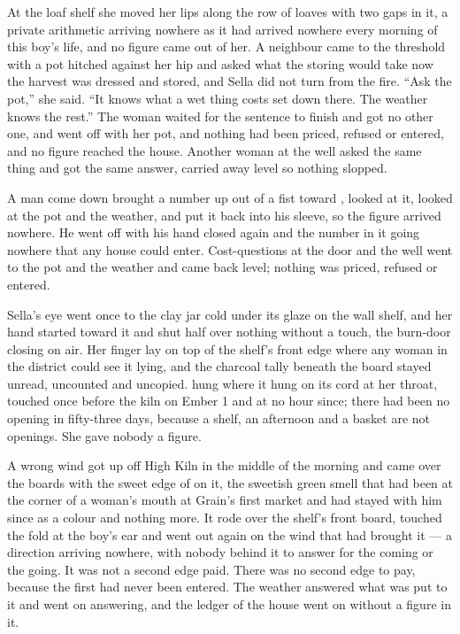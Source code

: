 At the loaf shelf she moved her lips along the row of loaves with two gaps in it, a private arithmetic arriving nowhere as it had arrived nowhere every morning of this boy's life, and no figure came out of her. A neighbour came to the threshold with a pot hitched against her hip and asked what the storing would take now the harvest was dressed and stored, and Sella did not turn from the fire. “Ask the pot,” she said. “It knows what a wet thing costs set down there. The weather knows the rest.” The woman waited for the sentence to finish and got no other one, and went off with her pot, and nothing had been priced, refused or entered, and no figure reached the house. Another woman at the well asked the same thing and got the same answer, carried away level so nothing slopped.

A man come down  brought a number up out of a fist toward , looked at it, looked at the pot and the weather, and put it back into his sleeve, so the figure arrived nowhere. He went off with his hand closed again and the number in it going nowhere that any house could enter. Cost-questions at the door and the well went to the pot and the weather and came back level; nothing was priced, refused or entered.

Sella's eye went once to the clay jar cold under its glaze on the wall shelf, and her hand started toward it and shut half over nothing without a touch, the burn-door closing on air. Her finger lay on top of the shelf's front edge where any woman in the district could see it lying, and the charcoal tally beneath the board stayed unread, uncounted and uncopied.  hung where it hung on its cord at her throat, touched once before the kiln on Ember 1 and at no hour since; there had been no opening in fifty-three days, because a shelf, an afternoon and a basket are not openings. She gave nobody a figure.

\scenebreak

A wrong wind got up off High Kiln in the middle of the morning and came over the boards with the sweet edge of  on it, the sweetish green smell that had been at the corner of a woman's mouth at Grain's first market and had stayed with him since as a colour and nothing more. It rode over the shelf's front board, touched the fold at the boy's ear and went out again on the wind that had brought it --- a direction arriving nowhere, with nobody behind it to answer for the coming or the going. It was not a second edge paid. There was no second edge to pay, because the first had never been entered. The weather answered what was put to it and went on answering, and the ledger of the house went on without a figure in it.

